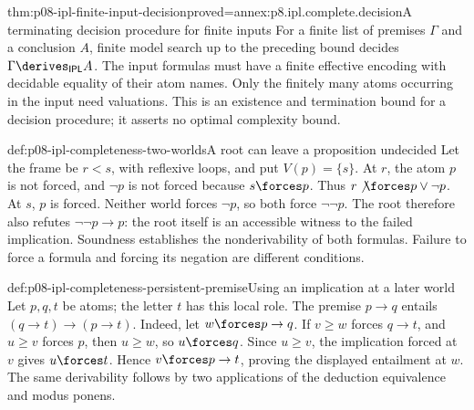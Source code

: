 \begin{hbcorollary}{thm:p08-ipl-finite-input-decision}{proved=annex:p8.ipl.complete.decision}{A terminating decision procedure for finite inputs}
For a finite list of premises \(\Gamma\) and a conclusion \(A\),
finite model search up to the preceding bound decides
\(\Gamma\derives_{\mathsf{IPL}}A\). The input formulas must have a
finite effective encoding with decidable equality of their atom names.
Only the finitely many atoms occurring in the input need valuations.
This is an existence and termination bound for a decision procedure;
it asserts no optimal complexity bound.
\end{hbcorollary}

\begin{hbexample}{def:p08-ipl-completeness-two-worlds}{A root can leave a proposition undecided}
Let the frame be \(r<s\), with reflexive loops, and put
\(V(p)=\{s\}\). At \(r\), the atom \(p\) is not forced, and
\(\neg p\) is not forced because \(s\forces p\). Thus
\(r\not\forces p\lor\neg p\). At \(s\), \(p\) is forced.
Neither world forces \(\neg p\), so both force \(\neg\neg p\).
The root therefore also refutes \(\neg\neg p\to p\): the root itself
is an accessible witness to the failed implication. Soundness establishes
the nonderivability of both formulas. Failure to force a formula and
forcing its negation are different conditions.
\end{hbexample}

\begin{hbexample}{def:p08-ipl-completeness-persistent-premise}{Using an implication at a later world}
Let \(p,q,t\) be atoms; the letter \(t\) has this local role.
The premise \(p\to q\) entails
\((q\to t)\to(p\to t)\). Indeed, let \(w\forces p\to q\).
If \(v\geq w\) forces \(q\to t\), and \(u\geq v\) forces
\(p\), then \(u\geq w\), so \(u\forces q\). Since \(u\geq v\),
the implication forced at \(v\) gives \(u\forces t\). Hence
\(v\forces p\to t\), proving the displayed entailment at \(w\).
The same derivability follows by two applications of the deduction
equivalence and modus ponens.
\end{hbexample}
